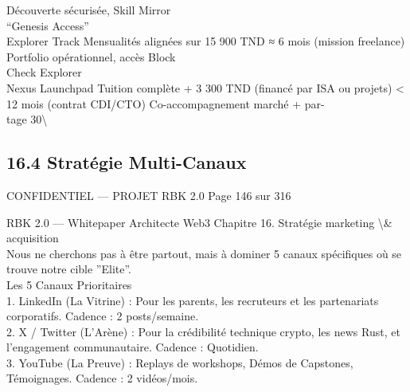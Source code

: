 \documentclass[12pt,landscape,a4paper]{article}
\newenvironment{confidential}
{\begin{tcolorbox}[
    colback=rbkred!5!white,
    colframe=rbkred!75!black,
    title=CONFIDENTIEL,
    fonttitle=\bfseries\color{white},
    coltitle=rbkred!75!black,
    breakable,
    enhanced,
    frame hidden,
    borderline west={2pt}{0pt}{rbkred!75!black}
]}
{\end{tcolorbox}}
\begin{document}
Découverte sécurisée, Skill Mirror\\
“Genesis Access”\\
Explorer Track  Mensualités alignées sur 15 900 TND                       ≈ 6 mois (mission freelance) Portfolio opérationnel, accès Block\\
Check Explorer\\
Nexus Launchpad Tuition complète + 3 300 TND (financé par ISA ou projets) \textless{} 12 mois (contrat CDI/CTO) Co-accompagnement marché + par-\\
tage 30\textbackslash{}%
\vspace{0.5em}
\vspace{0.5em}
\vspace{0.5em}
\vspace{0.5em}
\subsection{16.4 Stratégie Multi-Canaux}
\vspace{0.5em}
\begin{confidential}CONFIDENTIEL — PROJET RBK 2.0                                    Page 146 sur 316\end{confidential}
RBK 2.0 — Whitepaper Architecte Web3                                                             Chapitre 16. Stratégie marketing \textbackslash{}& acquisition\\
\vspace{0.5em}
\vspace{0.5em}
\vspace{0.5em}
Nous ne cherchons pas à être partout, mais à dominer 5 canaux spécifiques où se trouve notre cible ”Elite”.\\
\vspace{0.5em}
Les 5 Canaux Prioritaires\\
\vspace{0.5em}
1. LinkedIn (La Vitrine) : Pour les parents, les recruteurs et les partenariats corporatifs. Cadence : 2 posts/semaine.\\
\vspace{0.5em}
2. X / Twitter (L’Arène) : Pour la crédibilité technique crypto, les news Rust, et l’engagement communautaire. Cadence : Quotidien.\\
\vspace{0.5em}
3. YouTube (La Preuve) : Replays de workshops, Démos de Capstones, Témoignages. Cadence : 2 vidéos/mois.\\
\vspace{0.5em}
\end{document}
